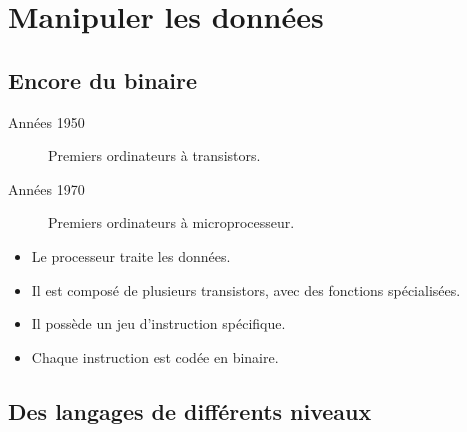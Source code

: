 \section[Manipuler]{Manipuler les données}
\subsection{Encore du binaire}

\begin{slide}
	\begin{description}
		\item[Années 1950] Premiers ordinateurs à transistors.
		\item[Années 1970] Premiers ordinateurs à microprocesseur. %
	\end{description}
\end{slide}

\begin{slide}
	\begin{itemize}
		\item Le processeur traite les données.
		\item Il est composé de plusieurs transistors, avec des fonctions spécialisées.
		\item Il possède un jeu d'instruction spécifique.
		\item Chaque instruction est codée en binaire.
	\end{itemize}
\end{slide}

\subsection{Des langages de différents niveaux}

